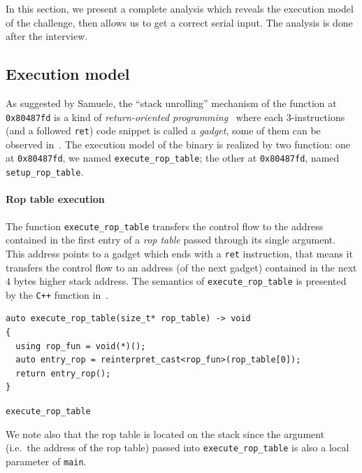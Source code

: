 \documentclass{easychair}
\begin{document}
In this section, we present a complete analysis which reveals the execution model of the challenge, then allows us to get a correct serial input. The analysis is done after the interview.

\subsection{Execution model}
\label{sec:execution_model}

As suggested by Samuele, the ``stack unrolling'' mechanism of the function at \texttt{0x80487fd} is a kind of \emph{return-oriented programming}~\autocite{shacham2007geometry} where each $3$-instructions (and a followed \texttt{ret}) code snippet is called a \emph{gadget}, some of them can be observed in~. The execution model of the binary is realized by two function: one at \texttt{0x80487fd}, we named \texttt{execute\_rop\_table}; the other at \texttt{0x80487fd}, named \texttt{setup\_rop\_table}.

\paragraph{Rop table execution}
The function \texttt{execute\_rop\_table} transfers the control flow to the address contained in the first entry of a \emph{rop table} passed through its single argument. This address points to a gadget which ends with a \texttt{ret} instruction, that means it transfers the control flow to an address (of the next gadget) contained in the next $4$ bytes higher stack address. The semantics of \texttt{execute\_rop\_table} is presented by the \texttt{C++} function in~.

\begin{listing}[ht]
  \begin{tcolorbox}
\begin{verbatim}
auto execute_rop_table(size_t* rop_table) -> void
{
  using rop_fun = void(*)();
  auto entry_rop = reinterpret_cast<rop_fun>(rop_table[0]);
  return entry_rop();
}
\end{verbatim}
  \end{tcolorbox}
  \caption{\texttt{execute\_rop\_table}}
  \label{lst:execute_rop_table}
\end{listing}

\begin{remark}
  We note also that the rop table is located on the stack since the argument (i.e.~the address of the rop table) passed into \texttt{execute\_rop\_table} is also a local parameter of \texttt{main}.
\end{remark}
\end{document}
